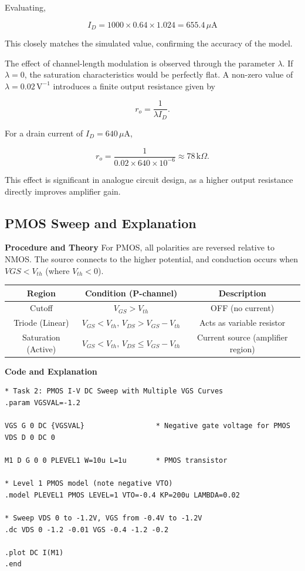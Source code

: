 \documentclass[a4paper,12pt]{article}
\begin{document}
Evaluating,

\[
I_D = 1000 \times 0.64 \times 1.024 = 655.4\,\mu\text{A}
\]

This closely matches the simulated value, confirming the accuracy of the model.

The effect of channel-length modulation is observed through the parameter $\lambda$. If $\lambda = 0$, the saturation characteristics would be perfectly flat. A non-zero value of $\lambda = 0.02\,\text{V}^{-1}$ introduces a finite output resistance given by

\begin{equation}
r_o = \frac{1}{\lambda I_D}.
\end{equation}

For a drain current of $I_D = 640\,\mu\text{A}$,

\begin{equation}
r_o = \frac{1}{0.02 \times 640 \times 10^{-6}} \approx 78\,\text{k}\Omega.
\end{equation}

This effect is significant in analogue circuit design, as a higher output resistance directly improves amplifier gain.

\subsection{PMOS Sweep and Explanation}

\textbf{Procedure and Theory}
For PMOS, all polarities are reversed relative to NMOS. The source connects to the higher potential, and conduction occurs when $VGS < V_{th}$ (where $V_{th} < 0$).

\begin{center}
\begin{tabular}{|c|c|c|}
\hline
\textbf{Region} & \textbf{Condition (P-channel)} & \textbf{Description} \\
\hline
Cutoff & $V_{GS} > V_{th}$ & OFF (no current) \\
Triode (Linear) & $V_{GS} < V_{th}, \, V_{DS} > V_{GS}-V_{th}$ & Acts as variable resistor \\
Saturation (Active) & $V_{GS} < V_{th}, \, V_{DS} \le V_{GS}-V_{th}$ & Current source (amplifier region) \\
\hline
\end{tabular}
\end{center}

\textbf{Code and Explanation}

\begin{lstlisting}[caption=PMOS Sweep Simulation Code, label=lst:pmos_sweep]
* Task 2: PMOS I-V DC Sweep with Multiple VGS Curves
.param VGSVAL=-1.2

VGS G 0 DC {VGSVAL}                 * Negative gate voltage for PMOS
VDS D 0 DC 0

M1 D G 0 0 PLEVEL1 W=10u L=1u       * PMOS transistor

* Level 1 PMOS model (note negative VTO)
.model PLEVEL1 PMOS LEVEL=1 VTO=-0.4 KP=200u LAMBDA=0.02

* Sweep VDS 0 to -1.2V, VGS from -0.4V to -1.2V
.dc VDS 0 -1.2 -0.01 VGS -0.4 -1.2 -0.2

.plot DC I(M1)
.end
\end{lstlisting}
\end{document}
